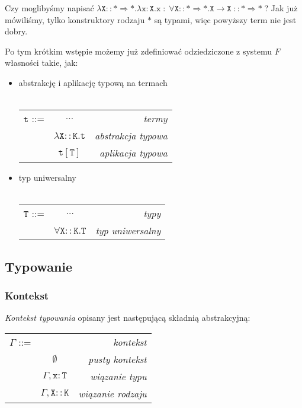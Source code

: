 \documentclass[11pt,leqno]{article}
\begin{document}
Czy moglibyśmy napisać $\mathtt{\lambda X::\ast \Rightarrow \ast. \lambda x:X.x \; : \; \forall X::\ast \Rightarrow \ast.X \rightarrow X \; ::\ast \Rightarrow \ast}\;$? Jak już mówiliśmy, tylko konstruktory rodzaju $\mathtt{\ast}$ są typami, więc powyższy term nie jest dobry.

Po tym krótkim wstępie możemy już zdefiniować odziedziczone z systemu $F$ własności takie, jak:  
\begin{itemize}
    \item abstrakcję i aplikację typową na termach \\ \\
\begin{tabular}{| l c r |}
  \hline
  $\mathtt{t}$ ::= & $\dots$ & \textit{termy} \\
   & $\mathtt{\lambda X::K.t}$ & \textit{abstrakcja typowa} \\
   & $\mathtt{t[T]}$ & \textit{aplikacja typowa} \\
  \hline
\end{tabular}

    \item typ uniwersalny \\ \\
\begin{tabular}{| l c r |}
  \hline
  $\mathtt{T}$ ::= & $\dots$ & \textit{typy}  \\
   & $\mathtt{\forall X::K.T}$ & \textit{typ uniwersalny} \\
  \hline
\end{tabular}

\end{itemize}


\subsection{Typowanie}

\subsubsection{Kontekst}

\emph{Kontekst typowania} opisany jest następującą składnią abstrakcyjną: \\

\begin{tabular}{ | l c r | }
	\hline
	$\mathtt{\Gamma}$ ::= & & \textit{kontekst}\\
	& $\mathtt{\emptyset}$ & \textit{pusty kontekst} \\
	& $\mathtt{\Gamma,x:T}$& \textit{wiązanie typu} \\ 
	& $\mathtt{\Gamma,X::K}$& \textit{wiązanie rodzaju} \\ 
	\hline
\end{tabular} \\
	
\end{document}
